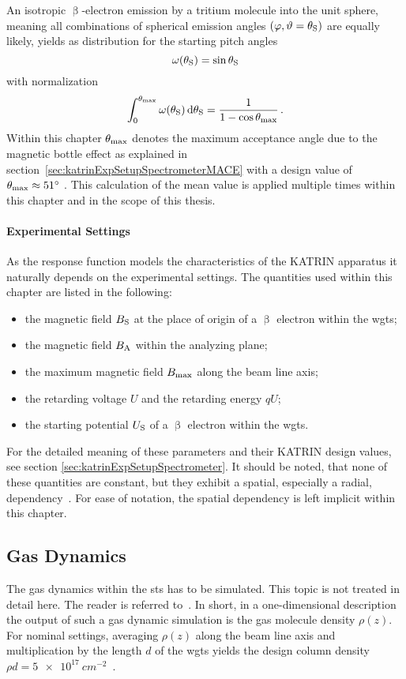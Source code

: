 An isotropic $\upbeta$-electron emission by a tritium molecule into the unit sphere, meaning all combinations of spherical emission angles $(\varphi, \vartheta=\theta_\mathrm{S})$ are equally likely, yields as distribution for the starting pitch angles\cite{Angrik:2005ep}
\begin{equation}
\omega(\theta_\mathrm{S}) = \sin\theta_\mathrm{S}
\end{equation}
with normalization
\begin{equation}
	\int_{0}^{\theta_\mathrm{max}} 
	\omega(\theta_\mathrm{S})
	\mathop{}\!\mathrm{d} \theta_\mathrm{S} = 
	\frac{1}{1-\cos\theta_\mathrm{max}}
	\text{\,.}
\end{equation}
Within this chapter $\theta_\mathrm{max}$ denotes the maximum acceptance angle due to the magnetic bottle effect as explained in section~\ref{sec:katrinExpSetupSpectrometerMACE} with a design value of $\theta_\mathrm{max}\approx\SI{51}{\degree}$ \cite{Angrik:2005ep}. This calculation of the mean value is applied multiple times within this chapter and in the scope of this thesis.

\paragraph{Experimental Settings}
As the response function models the characteristics of the KATRIN apparatus it naturally depends on the experimental settings. The quantities used within this chapter are listed in the following:
\begin{itemize}
	\item the magnetic field $B_\mathrm{S}$ at the place of origin of a $\upbeta$ electron within the \gls{wgts};
	\item the magnetic field $B_\mathrm{A}$ within the analyzing plane;
	\item the maximum magnetic field $B_\mathrm{max}$ along the beam line axis;
	\item the retarding voltage $U$ and the retarding energy $qU$;
	\item the starting potential $U_\mathrm{S}$ of a $\upbeta$ electron within the \gls{wgts}.
\end{itemize}
For the detailed meaning of these parameters and their KATRIN design values, see section \ref{sec:katrinExpSetupSpectrometer}.
It should be noted, that none of these quantities are constant, but they exhibit a spatial, especially a radial, dependency~\cite{Angrik:2005ep}. For ease of notation, the spatial dependency is left implicit within this chapter.


\subsection{Gas Dynamics}
\label{sec:intSpecModelResponseGasDynamics}
The gas dynamics within the \gls{sts} has to be simulated. This topic is not treated in detail here. The reader is referred to~\cite{Hoetzel2012}. In short, in a one-dimensional description the output of such a gas dynamic simulation is the gas molecule density $\rho(z)$. For nominal settings, averaging $\rho(z)$ along the beam line axis and multiplication by the length $d$ of the \gls{wgts} yields the design column density $\rho d = \SI{5e17}{cm^{-2}}$~\cite{Angrik:2005ep}.

